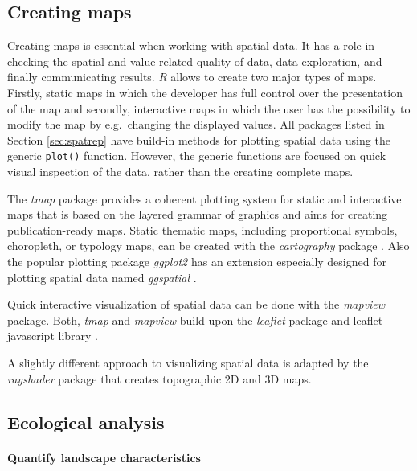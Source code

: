 \documentclass[smallextended]{svjour3}       %
\begin{document}
\hypertarget{creating-maps}{%
\subsection{Creating maps}\label{creating-maps}}

Creating maps is essential when working with spatial data.
It has a role in checking the spatial and value-related quality of data, data exploration, and finally communicating results.
\emph{R} allows to create two major types of maps.
Firstly, static maps in which the developer has full control over the presentation of the map and secondly, interactive maps in which the user has the possibility to modify the map by e.g.~changing the displayed values.
All packages listed in Section \ref{sec:spatrep} have build-in methods for plotting spatial data using the generic \texttt{plot()} function.
However, the generic functions are focused on quick visual inspection of the data, rather than the creating complete maps.

The \emph{tmap} package provides a coherent plotting system for static and interactive maps that is based on the layered grammar of graphics \cite{Tennekes2018} and aims for creating publication-ready maps.
Static thematic maps, including proportional symbols, choropleth, or typology maps, can be created with the \emph{cartography} package \cite{Giraud2016}.
Also the popular plotting package \emph{ggplot2} \cite{Wickham2016a} has an extension especially designed for plotting spatial data named \emph{ggspatial} \cite{R-ggspatial}.

Quick interactive visualization of spatial data can be done with the \emph{mapview} package\cite{R-mapview}.
Both, \emph{tmap} and \emph{mapview} build upon the \emph{leaflet} package and leaflet javascript library \cite{R-leaflet}.

A slightly different approach to visualizing spatial data is adapted by the \emph{rayshader} package \cite{Morgen-Wall2020} that creates topographic 2D and 3D maps.

\hypertarget{sec:ecological_analysis}{%
\subsection{Ecological analysis}\label{sec:ecological_analysis}}

\hypertarget{sec:landscape_metrics}{%
\paragraph{Quantify landscape characteristics}\label{sec:landscape_metrics}}
\end{document}
